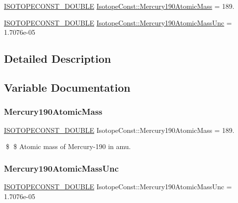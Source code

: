 \begin{DoxyCompactItemize}
\item 
\mbox{\hyperlink{group___isotope_const-_macros_ga8f45a7272ce02c0b4c65c44636ed719a}{I\+S\+O\+T\+O\+P\+E\+C\+O\+N\+S\+T\+\_\+\+D\+O\+U\+B\+LE}} \mbox{\hyperlink{group___isotope_const-_mercury-_hg190_ga8bef04d18cd3712810524f86b90cc2ed}{Isotope\+Const\+::\+Mercury190\+Atomic\+Mass}} = 189.
\item 
\mbox{\hyperlink{group___isotope_const-_macros_ga8f45a7272ce02c0b4c65c44636ed719a}{I\+S\+O\+T\+O\+P\+E\+C\+O\+N\+S\+T\+\_\+\+D\+O\+U\+B\+LE}} \mbox{\hyperlink{group___isotope_const-_mercury-_hg190_ga8d4bd5c94f398db6a63c360164200686}{Isotope\+Const\+::\+Mercury190\+Atomic\+Mass\+Unc}} = 1.\+7076e-\/05
\end{DoxyCompactItemize}


\subsection{Detailed Description}


\subsection{Variable Documentation}
\mbox{\label{group___isotope_const-_mercury-_hg190_ga8bef04d18cd3712810524f86b90cc2ed}} 
\subsubsection{\texorpdfstring{Mercury190\+Atomic\+Mass}{Mercury190AtomicMass}}
{\footnotesize\ttfamily \mbox{\hyperlink{group___isotope_const-_macros_ga8f45a7272ce02c0b4c65c44636ed719a}{I\+S\+O\+T\+O\+P\+E\+C\+O\+N\+S\+T\+\_\+\+D\+O\+U\+B\+LE}} Isotope\+Const\+::\+Mercury190\+Atomic\+Mass = 189.}

\$ \$ Atomic mass of Mercury-\/190 in amu. \mbox{\label{group___isotope_const-_mercury-_hg190_ga8d4bd5c94f398db6a63c360164200686}} 
\subsubsection{\texorpdfstring{Mercury190\+Atomic\+Mass\+Unc}{Mercury190AtomicMassUnc}}
{\footnotesize\ttfamily \mbox{\hyperlink{group___isotope_const-_macros_ga8f45a7272ce02c0b4c65c44636ed719a}{I\+S\+O\+T\+O\+P\+E\+C\+O\+N\+S\+T\+\_\+\+D\+O\+U\+B\+LE}} Isotope\+Const\+::\+Mercury190\+Atomic\+Mass\+Unc = 1.\+7076e-\/05}

